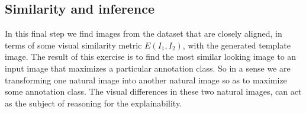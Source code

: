 \subsection{Similarity and inference}

In this final step we find images from the dataset that are closely aligned, in terms of some visual similarity metric $E(I_1, I_2)$, with the generated template image. The result of this exercise is to find the most similar looking image to an input image that maximizes a particular annotation class. So in a sense we are transforming one natural image into another natural image so as to maximize some annotation class. The visual differences in these two natural images, can act as the subject of reasoning for the explainability.